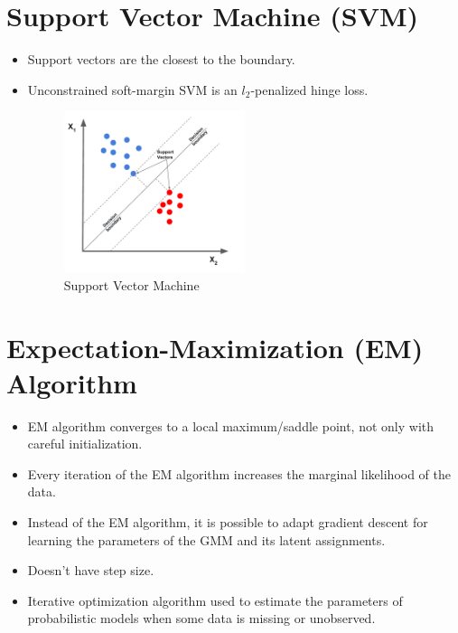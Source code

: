 \documentclass{article}
\begin{document}
\section{Support Vector Machine (SVM)}
\begin{itemize}
    \item Support vectors are the closest to the boundary.
    \item Unconstrained soft-margin SVM is an $l_2$-penalized hinge loss.
    \begin{figure}[h]
        \centering
        \includegraphics[width=0.5\textwidth]{assets/svm.png}
        \caption{Support Vector Machine}
    \end{figure}
\end{itemize}

\section{Expectation-Maximization (EM) Algorithm}
\begin{itemize}
    \item EM algorithm converges to a local maximum/saddle point, not only with careful initialization.
    \item Every iteration of the EM algorithm increases the marginal likelihood of the data.
    \item Instead of the EM algorithm, it is possible to adapt gradient descent for learning the parameters of the GMM and its latent assignments.
    \item Doesn't have step size.
    \item Iterative optimization algorithm used to estimate the parameters of probabilistic models when some data is missing or unobserved.
\end{itemize}

\end{document}
